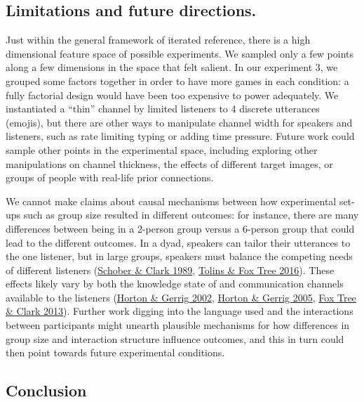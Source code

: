 \documentclass[
  english,
  a4paper,
]{article}
\begin{document}
\hypertarget{limitations-and-future-directions.}{%
\subsection{Limitations and future directions.}\label{limitations-and-future-directions.}}

Just within the general framework of iterated reference, there is a high dimensional feature space of possible experiments. We sampled only a few points along a few dimensions in the space that felt salient. In our experiment 3, we grouped some factors together in order to have more games in each condition: a fully factorial design would have been too expensive to power adequately. We instantiated a ``thin'' channel by limited listeners to 4 discrete utterances (emojis), but there are other ways to manipulate channel width for speakers and listeners, such as rate limiting typing or adding time pressure. Future work could sample other points in the experimental space, including exploring other manipulations on channel thickness, the effects of different target images, or groups of people with real-life prior connections.

We cannot make claims about causal mechanisms between how experimental set-ups such as group size resulted in different outcomes: for instance, there are many differences between being in a 2-person group versus a 6-person group that could lead to the different outcomes. In a dyad, speakers can tailor their utterances to the one listener, but in large groups, speakers must balance the competing needs of different listeners (\protect\hyperlink{ref-schober1989}{Schober \& Clark 1989}, \protect\hyperlink{ref-tolins2016}{Tolins \& Fox Tree 2016}). These effects likely vary by both the knowledge state of and communication channels available to the listeners (\protect\hyperlink{ref-horton2002}{Horton \& Gerrig 2002}, \protect\hyperlink{ref-horton2005}{Horton \& Gerrig 2005}, \protect\hyperlink{ref-fox-tree2013}{Fox Tree \& Clark 2013}). Further work digging into the language used and the interactions between participants might unearth plausible mechanisms for how differences in group size and interaction structure influence outcomes, and this in turn could then point towards future experimental conditions.

\hypertarget{conclusion}{%
\subsection{Conclusion}\label{conclusion}}
\end{document}
